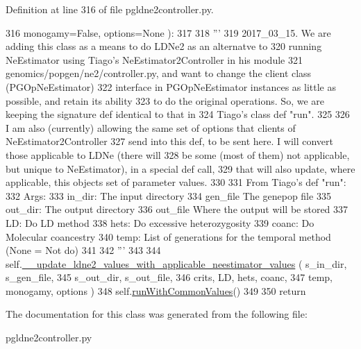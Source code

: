 Definition at line 316 of file pgldne2controller.\+py.


\begin{DoxyCode}
316                     monogamy=\textcolor{keyword}{False}, options=\textcolor{keywordtype}{None} ):
317 
318         \textcolor{stringliteral}{'''}
319 \textcolor{stringliteral}{        2017\_03\_15.  We are adding this class as a means to do LDNe2 as an alternatve to }
320 \textcolor{stringliteral}{        running NeEstimator using Tiago's NeEstimator2Controller in his module }
321 \textcolor{stringliteral}{        genomics/popgen/ne2/controller.py, and want to change the client class (PGOpNeEstimator)}
322 \textcolor{stringliteral}{        interface in PGOpNeEstimator instances as little as possible, and retain its ability}
323 \textcolor{stringliteral}{        to do the original operations.  So, we are keeping the signature  def identical to that in }
324 \textcolor{stringliteral}{        Tiago's class def "run".}
325 \textcolor{stringliteral}{}
326 \textcolor{stringliteral}{        I am also (currently) allowing the same set of options that clients of NeEstimator2Controller}
327 \textcolor{stringliteral}{        send into this def, to be sent here.  I will convert those applicable to LDNe (there will}
328 \textcolor{stringliteral}{        be some (most of them) not applicable, but unique to NeEstimator), in a special def call, }
329 \textcolor{stringliteral}{        that will also update, where applicable, this objects set of parameter values.}
330 \textcolor{stringliteral}{        }
331 \textcolor{stringliteral}{        From Tiago's def "run":}
332 \textcolor{stringliteral}{        Args:}
333 \textcolor{stringliteral}{            in\_dir: The input directory}
334 \textcolor{stringliteral}{            gen\_file The genepop file}
335 \textcolor{stringliteral}{            out\_dir: The output directory}
336 \textcolor{stringliteral}{            out\_file Where the output will be stored}
337 \textcolor{stringliteral}{            LD: Do LD method}
338 \textcolor{stringliteral}{            hets: Do excessive heterozygosity}
339 \textcolor{stringliteral}{            coanc: Do Molecular coancestry}
340 \textcolor{stringliteral}{            temp: List of generations for the temporal method (None = Not do)}
341 \textcolor{stringliteral}{}
342 \textcolor{stringliteral}{        '''}
343 
344         self.\hyperlink{classnegui_1_1pgldne2controller_1_1PGLDNe2Controller_a3e79d1ce0867cd1ad29b611bcf9b659a}{\_\_update\_ldne2\_values\_with\_applicable\_neestimator\_values}
      (  s\_in\_dir, s\_gen\_file, 
345                                                                         s\_out\_dir, s\_out\_file, 
346                                                                         crits, LD, hets, coanc, 
347                                                                         temp, monogamy, options )
348         self.\hyperlink{classnegui_1_1pgldne2controller_1_1PGLDNe2Controller_a1b95e9adb250015f53209507fd315e51}{runWithCommonValues}()           
349 
350         \textcolor{keywordflow}{return}
\end{DoxyCode}


The documentation for this class was generated from the following file\+:\begin{DoxyCompactItemize}
\item 
pgldne2controller.\+py\end{DoxyCompactItemize}
